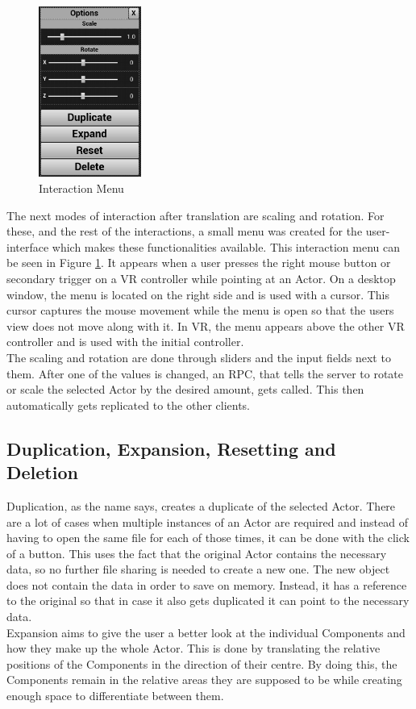 \begin{figure}
	\centering
	\includegraphics[width=0.30\textwidth]{fig/InteractionMenu2.png}
	\caption[Interaction Menu instead of UI Editor]{Interaction Menu}
	\label{fig:InteractionMenu}
\end{figure}

The next modes of interaction after translation are scaling and rotation. For these, and the rest of the interactions, a small menu was created for the user-interface which makes these functionalities available. This interaction menu can be seen in Figure \ref{fig:InteractionMenu}. It appears when a user presses the right mouse button or secondary trigger on a \acs{VR} controller while pointing at an Actor. On a desktop window, the menu is located on the right side and is used with a cursor. This cursor captures the mouse movement while the menu is open so that the users view does not move along with it. In \acs{VR}, the menu appears above the other VR controller and is used with the initial controller.\\
The scaling and rotation are done through sliders and the input fields next to them. After one of the values is changed, an \acs{RPC}, that tells the server to rotate or scale the selected Actor by the desired amount, gets called. This then automatically gets replicated to the other clients.

\subsection{Duplication, Expansion, Resetting and Deletion}

Duplication, as the name says, creates a duplicate of the selected Actor. There are a lot of cases when multiple instances of an Actor are required and instead of having to open the same file for each of those times, it can be done with the click of a button. This uses the fact that the original Actor contains the necessary data, so no further file sharing is needed to create a new one. The new object does not contain the data in order to save on memory. Instead, it has a reference to the original so that in case it also gets duplicated it can point to the necessary data.\\
Expansion aims to give the user a better look at the individual Components and how they make up the whole Actor. This is done by translating the relative positions of the Components in the direction of their centre. By doing this, the Components remain in the relative areas they are supposed to be while creating enough space to differentiate between them.

